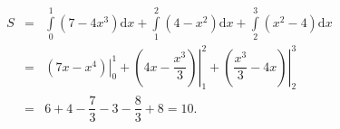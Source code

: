 \begin{ex}
{\begin{eqnarray*}
	 S&=&\displaystyle\int\limits_0^1\left(7-4 x^3\right) \mathrm{d}x+\displaystyle\int\limits_1^2\left(4-x^2\right) \mathrm{d}x+\displaystyle\int\limits_2^3\left(x^2-4\right) \mathrm{d}x \\ & =&\left.\left(7 x-x^4\right)\right|_0 ^1+\left.\left(4 x-\dfrac{x^3}{3}\right)\right|_1 ^2+\left.\left(\dfrac{x^3}{3}-4 x\right)\right|_2 ^3
	\\&=&6+4-\dfrac{7}{3}-3-\dfrac{8}{3}+8=10 .
\end{eqnarray*}
}
\end{ex}

